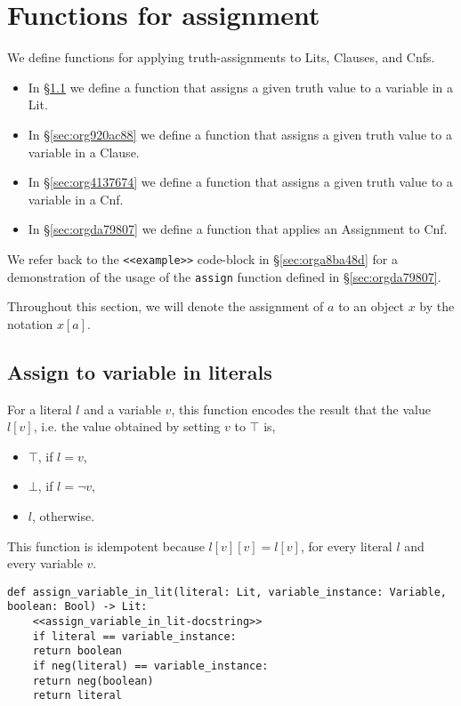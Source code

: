 \documentclass[11pt]{article}
\begin{document}
\section{Functions for assignment}
\label{sec:org3162dd0}
We define functions for applying truth-assignments to Lits, Clauses, and Cnfs.
\begin{itemize}
\item In \S \ref{sec:orgdde8b5a} we define a function that assigns a
given truth value to a variable in a Lit.
\item In \S \ref{sec:org920ac88} we define a function that assigns a
given truth value to a variable in a Clause.
\item In \S \ref{sec:org4137674} we define a function that assigns a given
truth value to a variable in a Cnf.
\item In \S \ref{sec:orgda79807} we define a function that applies an Assignment to Cnf.
\end{itemize}

We refer back to the \texttt{<<example>>} code-block in \S \ref{sec:orga8ba48d} for a
demonstration of the usage of the \texttt{assign} function defined in \S \ref{sec:orgda79807}.

Throughout this section, we will denote the assignment of \(a\) to an
object \(x\) by the notation \(x[a]\).

\subsection{Assign to variable in literals}
\label{sec:orgdde8b5a}
For a literal \(l\) and a variable \(v\), this function encodes the result
that the value \(l[v]\), i.e. the value obtained by setting \(v\) to \(\top\) is,
\begin{itemize}
\item \(\top\), if \(l = v\),
\item \(\bot\), if \(l = \neg v\),
\item \(l\), otherwise.
\end{itemize}

This function is idempotent because \(l[v][v] = l[v]\), for every literal
\(l\) and every variable \(v\).

\begin{verbatim}
def assign_variable_in_lit(literal: Lit, variable_instance: Variable, boolean: Bool) -> Lit:
    <<assign_variable_in_lit-docstring>>
    if literal == variable_instance:
	return boolean
    if neg(literal) == variable_instance:
	return neg(boolean)
    return literal
\end{verbatim}
\end{document}
